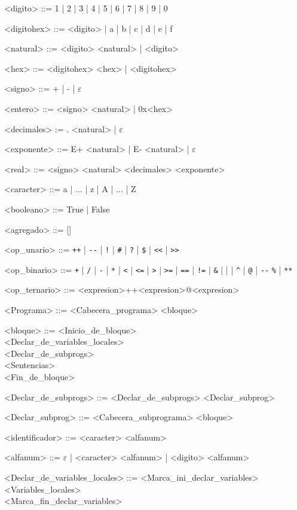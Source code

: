 \documentclass{scrartcl}
\begin{document}
\setlength{\grammarparsep}{4pt plus 1pt minus 1pt}
\begin{grammar}

<digito> ::= 1 | 2 | 3 | 4 | 5 | 6 | 7 | 8 | 9 | 0

<digitohex> ::= <digito> | a | b | c | d | e | f

<natural> ::= <digito> <natural> | <digito>

<hex> ::= <digitohex> <hex> | <digitohex>

<signo> ::= + | - | $\varepsilon$

<entero> ::= <signo> <natural> | 0x<hex>

<decimales> := . <natural> | $\varepsilon$

<exponente> ::= E+ <natural> | E- <natural> | $\varepsilon$

<real> ::= <signo> <natural> <decimales> <exponente>

<caracter> ::= a | ... | z | A | ... | Z

<booleano> ::= True | False

<agregado> ::= []

<op_unario> ::= \verb|++| | \verb|--| | \verb|!| | \verb|#| | \verb|?| | \verb|$| | \verb|<<| | \verb|>>|

<op_binario> ::= \verb|+| | \verb|/| | \verb|-| | \verb|*| | \verb|<| | \verb|<=| | \verb|>| | \verb|>=| | \verb|==| | \verb|!=| | \verb|&| | \verb||| | \verb|^| | \verb|@| | \verb|--| \verb|%| | \verb|**|

<op_ternario> ::= <expresion>++<expresion>@<expresion>

<Programa> ::= <Cabecera_programa> <bloque>

<bloque> ::= <Inicio_de_bloque> \\
 <Declar_de_variables_locales> \\
 <Declar_de_subprogs> \\
 <Sentencias> \\
 <Fin_de_bloque>

<Declar_de_subprogs> ::= <Declar_de_subprogs> <Declar_subprog>

<Declar_subprog> ::= <Cabecera_subprograma> <bloque>

<identificador> ::= <caracter> <alfanum>

<alfanum> ::= $\varepsilon$ | <caracter> <alfanum> | <digito> <alfanum>

<Declar_de_variables_locales> ::= <Marca_ini_declar_variables> \\
<Variables_locales> \\
<Marca_fin_declar_variables>


\end{grammar}
\end{document}
